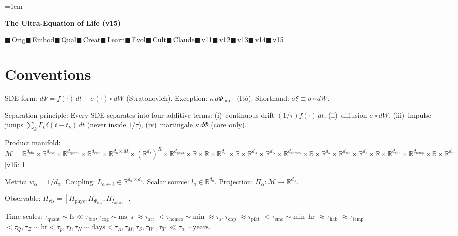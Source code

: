\documentclass[8pt,landscape]{extarticle}
\newcommand{\fix}[1]{\textcolor{fixcolor}{#1}}
\newcommand{\vnew}[1]{\textcolor{v13color}{#1}}
\newcommand{\vfour}[1]{\textcolor{v14color}{#1}}
\newcommand{\vfive}[1]{\textcolor{v15color}{#1}}
\newcommand{\vfivelabel}[1]{\textcolor{v15color}{\textsf{\scriptsize[v15: #1]}}}
\begin{document}
\emergencystretch=1em
\begin{multicols}{3}

{\large\bfseries The Ultra-Equation of Life (\vfive{v15})}

{\scriptsize $\blacksquare$\,Orig\quad $\blacksquare$\,Embod\quad $\blacksquare$\,Qual\quad $\blacksquare$\,Creat\quad $\blacksquare$\,Learn\quad $\blacksquare$\,Evol\quad $\blacksquare$\,Cult\quad $\blacksquare$\,Claude\quad $\blacksquare$\,v11\quad \fix{$\blacksquare$\,v12}\quad \vnew{$\blacksquare$\,v13}\quad \vfour{$\blacksquare$\,v14}\quad \vfive{$\blacksquare$\,v15}}

\section*{Conventions}

SDE form: $d\Psi = f(\cdot)\,dt + \sigma(\cdot) \circ dW$ (Stratonovich).
Exception: $\kappa\,d\Phi_{\mathrm{mart}}$ (It\^o).
Shorthand: $\sigma\xi \equiv \sigma \circ dW$.

Separation principle: Every SDE separates into four additive terms:
(i)~continuous drift $(1/\tau)f(\cdot)\,dt$,
(ii)~diffusion $\sigma \circ dW$,
(iii)~impulse jumps $\sum_k \Gamma_k \delta(t-t_k)\,dt$ (never inside $1/\tau$),
(iv)~martingale $\kappa\,d\Phi$ (core only).

Product manifold:
\vfive{$\mathcal{M} = \mathbb{R}^{d_{\mathrm{bio}}} \times \mathbb{R}^{d_{\mathrm{cog}}} \times \mathbb{R}^{d_{\mathrm{quant}}} \times \mathbb{R}^{d_{\mathrm{emo}}} \times \mathbb{R}^{d_p \times M} \times (\mathbb{R}^{d_I})^R \times \mathbb{R}^{d_{\mathrm{phys}}} \times \mathbb{R} \times \mathbb{R} \times \mathbb{R}^{d_L} \times \mathbb{R} \times \mathbb{R}^{d_\Lambda} \times \mathbb{R}^{d_N} \times \mathbb{R}^{d_{\mathrm{homeo}}} \times \mathbb{R} \times \mathbb{R}^{d_\theta} \times \mathbb{R}^{d_{\mathrm{att}}} \times \mathbb{R}^{d_\varepsilon} \times \mathbb{R} \times \mathbb{R}^{d_{\mathrm{hab}}} \times \mathbb{R}^{d_{\mathrm{temp}}} \times \mathbb{R} \times \mathbb{R}^{d_\alpha}$} \vfivelabel{1}

Metric: $w_\alpha = 1/d_\alpha$. Coupling: $L_{a\leftarrow b} \in \mathbb{R}^{d_a \times d_b}$. Scalar source: $l_a \in \mathbb{R}^{d_a}$. Projection: $\Pi_\alpha: \mathcal{M} \to \mathbb{R}^{d_\alpha}$.

Observable: $\Pi_{\mathrm{vis}} = [\Pi_{\mathrm{phys}}, \Pi_{\Psi_{\mathrm{env}}}, \Pi_{I_{\mathrm{active}}}]$.

Time scales: $\tau_{\mathrm{quant}} \sim \mathrm{fs} \ll \tau_{\mathrm{bio}}, \tau_{\mathrm{cog}} \sim \text{ms--s}$ \vnew{$\approx \tau_{\mathrm{att}}$} $< \tau_{\mathrm{homeo}} \sim \text{min}$ \vnew{$\approx \tau_\varepsilon, \tau_{\mathrm{cap}}$} \vfour{$\approx \tau_{\mathrm{pfat}}$} $< \tau_{\mathrm{emo}} \sim \text{min--hr}$ \vnew{$\approx \tau_{\mathrm{hab}}$} \vfour{$\approx \tau_{\mathrm{temp}}$} $< \tau_Q, \tau_\Xi \sim \text{hr} < \tau_p, \tau_I, \tau_N \sim \text{days} < \tau_\Lambda, \tau_M, \tau_S, \tau_W$ \vfour{$, \tau_T$} \vfive{$\ll \tau_\alpha$} $\sim \text{years}$.


\end{multicols}
\end{document}
